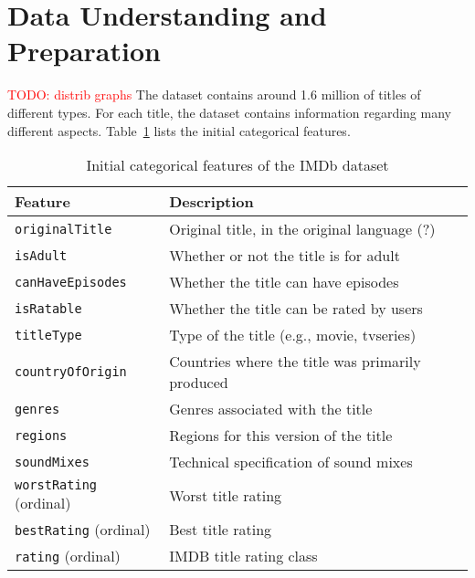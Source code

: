 \section{Data Understanding and Preparation}
\textcolor{red}{TODO: distrib graphs}
The dataset contains around 1.6 million of titles of different types.
For each title, the dataset contains information regarding many different
aspects. Table~\ref{tab:initial_categorical_features} lists the initial categorical
features.
\begin{table}[H]
    \centering
    \begin{tabular}{|p{4cm}|p{9cm}|}

        \hline
        \textbf{Feature} & \textbf{Description} \\ \hline
        \texttt{originalTitle} & Original title, in the original language (?) \\ \hline
        \texttt{isAdult} & Whether or not the title is for adult \\ \hline
        \texttt{canHaveEpisodes} & Whether the title can have episodes \\ \hline
        \texttt{isRatable} & Whether the title can be rated by users \\ \hline
        \texttt{titleType} & Type of the title (e.g., movie, tvseries) \\ \hline
        \texttt{countryOfOrigin} & Countries where the title was primarily produced \\ \hline
        \texttt{genres} & Genres associated with the title \\ \hline
        \texttt{regions} & Regions for this version of the title \\ \hline
        \texttt{soundMixes} & Technical specification of sound mixes \\ \hline
        \texttt{worstRating} (ordinal) & Worst title rating \\ \hline
        \texttt{bestRating} (ordinal) & Best title rating \\ \hline
        \texttt{rating} (ordinal) & IMDB title rating class \\ \hline
    \end{tabular}
    \caption{Initial categorical features of the IMDb dataset}
    \label{tab:initial_categorical_features}
\end{table}


